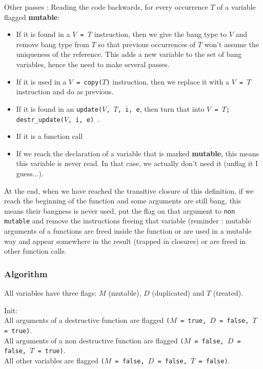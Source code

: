 \documentclass[12pt,a4paper,titlepage]{article}
\newcommand{\cl}[1]{\texttt{#1}}
\begin{document}
Other passes :
Reading the code backwards, for every occurrence $T$ of a variable flagged \textbf{mutable}:
\begin{itemize}
\item If it is found in a \cl{$V$ = $T$} instruction, then we give the bang type to $V$ and remove bang type from $T$ so that previous occurrences of $T$ won't assume the uniqueness of the reference. This adds a new variable to the set of bang variables, hence the need to make several passes.
\item If it is used in a \cl{$V$ = copy($T$)} instruction, then we replace it with a \cl{$V$ = $T$} instruction and do as previous.
\item If it is found in an \cl{update($V$, $T$, i, e}, then turn that into \cl{$V$ = $T$; destr\_update($V$, i, e) }.
\item If it is a function call 
\item If we reach the declaration of a variable that is marked \textbf{mutable}, this means this variable is never read. In that case, we actually don't need it (unflag it I guess...).
\end{itemize}

At the end, when we have reached the transitive closure of this definition, if we reach the beginning of the function and some arguments are still bang, this means their bangness is never used, put the flag on that argument to \cl{non mutable} and remove the instructions freeing that variable (reminder : mutable arguments of a functions are freed inside the function or are used in a mutable way and appear somewhere in the result (trapped in closures) or are freed in other function calls.



\subsubsection{Algorithm}




All variables have three flags: $M$ (mutable), $D$ (duplicated) and $T$ (treated).

Init:\\
All arguments of a destructive function are flagged \cl{($M$ = true, $D$ = false, $T$ = true)}.\\
All arguments of a non destructive function are flagged \cl{($M$ = false, $D$ = false, $T$ = true)}.\\
All other variables are flagged \cl{($M$ = false, $D$ = false, $T$ = false)}.\\
\end{document}
